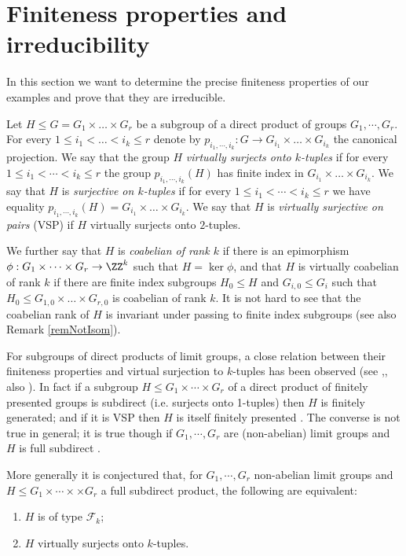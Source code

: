 \section{Finiteness properties and irreducibility}
\label{secNotProd}

In this section we want to determine the precise finiteness properties of our examples and prove that they are irreducible.

 Let $H\leq G = G_1\times\dots \times G_r$ be a subgroup of a direct product of groups $G_1,\cdots, G_r$. For every $1\leq i_1 < \dots < i_k \leq r$ denote by $p_{i_1,\cdots,i_k}: G \rightarrow G_{i_1}\times \dots \times G_{i_k}$ the canonical projection. We say that the group $H$ \textit{virtually surjects onto $k$-tuples} if for every $1\leq i_1 < \cdots < i_k\leq r$ the group $p_{i_1,\cdots, i_k}(H)$ has finite index in $G_{i_1}\times \dots \times G_{i_k}$. We say that $H$ is \textit{surjective on $k$-tuples} if for every $1\leq i_1 < \cdots < i_k\leq r$ we have equality $p_{i_1,\cdots,i_k}(H)=G_{i_1}\times \dots \times G_{i_k}$. We say that $H$ is \textit{virtually surjective on pairs} (VSP) if $H$ virtually surjects onto $2$-tuples.
 
 We further say that $H$ is \textit{coabelian of rank $k$} if there is an epimorphism $\phi: G_1\times \dots \times G_r\to \ZZ^k$ such that $H=\ker \phi$, and that $H$ is virtually coabelian of rank $k$ if there are finite index subgroups $H_0\leq H$ and $G_{i,0}\leq G_i$ such that $H_0\leq G_{1,0}\times \dots \times G_{r,0}$ is coabelian of rank $k$. It is not hard to see that the coabelian rank of $H$ is invariant under passing to finite index subgroups (see also Remark \ref{remNotIsom}).

For subgroups of direct products of limit groups, a close relation between their finiteness properties and virtual surjection to $k$-tuples has been observed (see \cite{BriHowMilSho-13},\cite{Koc-10}, also \cite{Kuc-14}). In fact if a subgroup $H\leq G_1\times \cdots \times G_r$ of a direct product of finitely presented groups is subdirect (i.e. surjects onto 1-tuples) then $H$ is finitely generated; and if it is VSP then $H$ is itself finitely presented \cite[Theorem A]{BriHowMilSho-13}. The converse is not true in general; it is true though if $G_1,\cdots, G_r$ are (non-abelian) limit groups and $H$ is full subdirect \cite[Theorem D]{BriHowMilSho-13}.

More generally it is conjectured \cite{Koc-10} that, for $G_1,\cdots, G_r$ non-abelian limit groups and $H\leq G_1\times \cdots \times \times G_r$ a full subdirect product, the following are equivalent:
\begin{enumerate}
 \item $H$ is of type $\mathcal{F}_k$;
 \item $H$ virtually surjects onto $k$-tuples.
\end{enumerate}  

